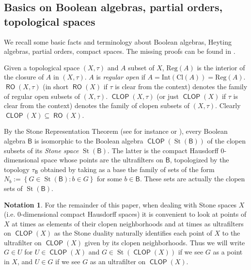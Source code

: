 \documentclass[11pt]{amsart}
\theoremstyle{plain}
\theoremstyle{definition}
\newtheorem{notation}[theorem]{Notation}
\theoremstyle{plain}
\theoremstyle{remark}
\DeclareMathOperator{\St}{St}
\DeclareMathOperator{\RO}{\mathsf{RO}}
\DeclareMathOperator{\CLOP}{\mathsf{CLOP}}
\newcommand{\bool}[1]{\mathsf{#1}}
\newcommand{\Int}[1]{\mathrm{Int}\left(#1\right)}
\newcommand{\Cl}[1]{\mathrm{Cl}\left(#1\right)}
\newcommand{\Reg}[1]{\mathrm{Reg}\left(#1\right)}
\newcommand{\bp}[1]{\left\lbrace #1 \right\rbrace}
\newcommand{\0}{\mathsf{0}}
\renewcommand{\1}{\mathsf{1}}
\renewcommand{\2}{\mathsf{2}}
\theoremstyle{definition}
\begin{document}
\subsection{Basics on Boolean algebras, partial orders, topological spaces}
We recall some basic facts and terminology about Boolean algebras, Heyting algebras, partial orders, compact spaces. The missing proofs can be found in \cite{JECH, JohnStone, viale-bookonforcing}.

Given a topological space $(X,\tau)$
and $A$ subset of $X$, $\Reg{A}$ is the interior of the closure of $A$ in $(X,\tau)$. 
$A$ is \emph{regular open} if $A=\Int{\Cl{A}}=\Reg{A}$.  
$\RO(X,\tau)$ (in short $\RO(X)$ if $\tau$ is clear from the context) denotes the family of regular open subsets of $(X,\tau)$.
$\CLOP(X,\tau)$ (or just $\CLOP(X)$ if $\tau$ is clear from the context) denotes the family of clopen subsets of $(X,\tau)$.
Clearly $\CLOP(X)\subseteq\RO(X)$.

By the Stone Representation Theorem (see for instance \cite[Theorem 3.8.2]{viale-bookonforcing} or \cite[Theorem 7.11]{JECH}), every Boolean algebra $\bool{B}$ is isomorphic to the Boolean algebra 
$\CLOP(\St(\bool{B}))$ of the clopen subsets of its \emph{Stone space}
$\St(\bool{B})$.
The latter is the compact Hausdorff $0$-dimensional space
whose points are the ultrafilters on $\bool{B}$, topologized by the topology $\tau_\bool{B}$ obtained by taking as a base the family of sets of the form
$N_b:=\bp{G\in\St(\bool{B}): b\in G}$ for some $b\in\bool{B}$. These sets are actually the clopen sets of $\St(\bool{B})$.
\begin{notation}\label{not:stonespaces}
For the remainder of this paper, when dealing with Stone spaces $X$ (i.e. $0$-dimensional compact Hausdorff spaces) it is convenient to look at points of $X$ at times as elements of their clopen neighborhoods and at times as ultrafilters on $\CLOP(X)$ as the Stone duality naturally identifies each point of $X$ to the ultrafilter on $\CLOP(X)$ given by its clopen neighborhoods. Thus we will write $G\in U$ for $U\in\CLOP(X)$ and $G\in \St(\CLOP(X))$ if we see $G$ as a point in $X$, and $U\in G$ if we see $G$ as an ultrafilter on $\CLOP(X)$.
\end{notation}
\end{document}

